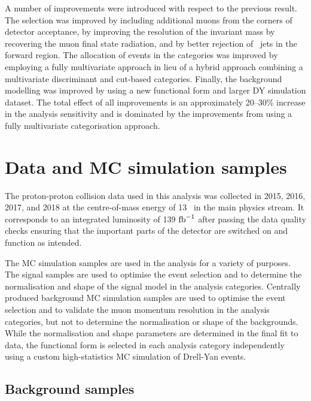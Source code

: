 A number of improvements were introduced with respect to the
previous result. The selection was improved by including additional
muons from the corners of detector acceptance, by improving
the resolution of the invariant mass by recovering the muon final
state radiation, and by better rejection of \pileup~jets in the
forward region. The allocation of events in the categories was
improved by employing a fully multivariate approach in lieu
of a hybrid approach combining a multivariate discriminant and 
cut-based categories. Finally, the background modelling was
improved by using a new functional form and larger DY simulation
dataset. The total effect of all improvements is an approximately
20--30\% increase in the analysis sensitivity and is dominated
by the improvements from using a fully multivariate categorisation
approach.

\section{Data and MC simulation samples}

The proton-proton collision data used in this analysis was
collected in 2015, 2016, 2017, and 2018 at the centre-of-mass
energy of 13 \TeV~in the main physics stream. It corresponds
to an integrated luminosity of 139 $\text{fb}^{-1}$ after passing the data
quality checks ensuring that the important parts of the
detector are switched on and function as intended.

The MC simulation samples are used in the analysis for a 
variety of purposes. The signal samples are used to optimise
the event selection and to determine the normalisation and
shape of the signal model in the analysis categories.
Centrally produced background MC simulation samples are used
to optimise the event selection and to validate the muon
momentum resolution in the analysis categories, but not to
determine the normalisation or shape of the backgrounds.
While the normalisation and shape parameters are determined
in the final fit to data, the functional form is selected
in each analysis category independently using a custom
high-statistics MC simulation of Drell-Yan events.

\subsection{Background samples}

\label{sec:bkg-mc}

